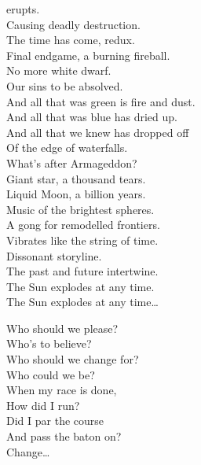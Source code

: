  erupts. \\
Causing deadly destruction. \\
The time has come, redux. \\
Final endgame, a burning fireball. \\
No more white dwarf. \\
Our sins to be absolved. \\

And all that was green is fire and dust. \\
And all that was blue has dried up. \\
And all that we knew has dropped off \\
Of the edge of waterfalls. \\
What's after Armageddon? \\

Giant star, a thousand tears. \\
Liquid Moon, a billion years. \\
Music of the brightest spheres. \\
A gong for remodelled frontiers. \\

Vibrates like the string of time. \\
Dissonant storyline. \\
The past and future intertwine. \\
The Sun explodes at any time. \\

The Sun explodes at any time… \\





Who should we please? \\
Who's to believe? \\
Who should we change for? \\
Who could we be? \\

When my race is done, \\
How did I run? \\
Did I par the course \\
And pass the baton on? \\

Change… \\
